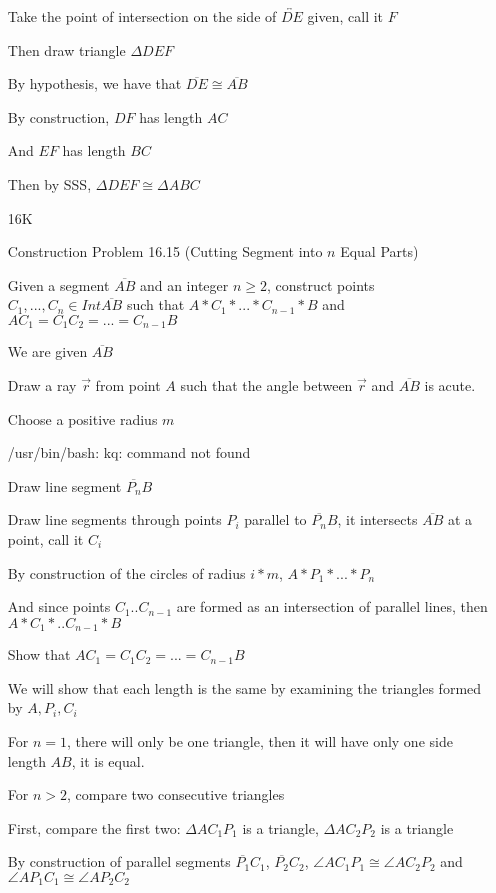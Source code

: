 \documentclass[11pt]{article}
\newcommand{\ray}[1]{\overrightarrow{#1}}
\newcommand{\lines}[1]{\overleftrightarrow{#1}}
\newcommand{\segment}[1]{\overline{#1}}
\begin{document}
\begin{itemize}
		Take the point of intersection on the side of $\lines{DE}$ given, call it $F$

		Then draw triangle $\Delta DEF$

		By hypothesis, we have that $\segment{DE} \cong \segment{AB}$

		By construction, $DF$ has length $AC$

		And $EF$ has length $BC$

		Then by SSS, $\Delta DEF \cong \Delta ABC$

	\item[16K]

		Construction Problem 16.15 (Cutting Segment into $n$ Equal Parts)

		Given a segment $\segment{AB}$ and an integer $n \geq 2$, construct points $C_1, ... , C_n \in Int \segment{AB}$ such that $A* C_1 * ... *C_{n-1} * B$ and $AC_1 = C_1C_2 = ... = C_{n-1}B$

		We are given $\segment{AB}$

		Draw a ray $\ray{r}$ from point $A$ such that the angle between $\ray{r}$ and $\segment{AB}$ is acute.

		Choose a positive radius $m$

/usr/bin/bash: kq: command not found

		Draw line segment $\segment{P_n}{B}$

		Draw line segments through points $P_i$ parallel to $\segment{P_n}{B}$, it intersects $\segment{AB}$ at a point, call it $C_i$

		By construction of the circles of radius $i * m$, $A*P_1 * ... * P_n$

		And since points $C_1 .. C_{n-1}$ are formed as an intersection of parallel lines, then $A*C_1 * .. C_{n-1} * B$

		Show that $AC_1 = C_1C_2 = ... = C_{n-1}B$

		We will show that each length is the same by examining the triangles formed by $A, P_i, C_i$

		For $n = 1$, there will only be one triangle, then it will have only one side length $AB$, it is equal.

		For $n > 2$, compare two consecutive triangles
		
		First, compare the first two: $\Delta AC_1P_1$ is a triangle, $\Delta AC_2P_2$ is a triangle

		By construction of parallel segments $\segment{P_1}{C_1}$, $\segment{P_2}{C_2}$, $\angle AC_1P_1 \cong \angle AC_2P_2$ and $\angle AP_1C_1 \cong \angle AP_2C_2$


\end{itemize}
\end{document}
